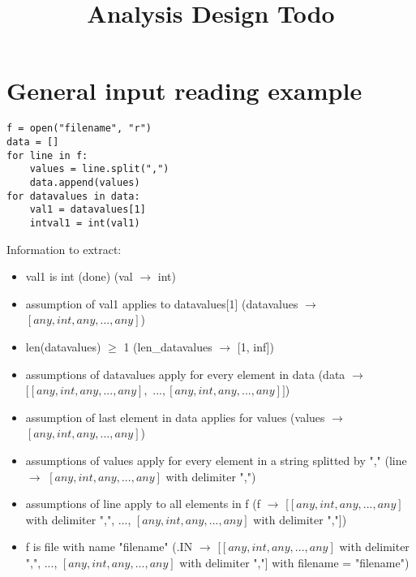 \documentclass[11pt]{article}
\begin{document}
\title{Analysis Design Todo}

\maketitle


\section{General input reading example}

\begin{lstlisting}
f = open("filename", "r")
data = []
for line in f:
    values = line.split(",")
    data.append(values)
for datavalues in data:
    val1 = datavalues[1]
    intval1 = int(val1)
\end{lstlisting}

Information to extract:\\

\begin{itemize}
  \item val1 is int (done) (val $\rightarrow$ int)
  \item assumption of val1 applies to datavalues[1] (datavalues $\rightarrow$ $[any, int, any, ..., any]$)
  \item len(datavalues) $\ge$ 1 (len\_datavalues $\rightarrow$ [1, inf])
  \item assumptions of datavalues apply for every element in data (data $\rightarrow$ $[[any, int, any, ..., any], $ $..., [any, int, any, ..., any]]$)
  \item assumption of last element in data applies for values (values $\rightarrow$ $[any, int, any, ..., any]$)
  \item assumptions of values apply for every element in a string splitted by "," (line $\rightarrow$ $[any, int, any, ..., any]$ with delimiter ",")
  \item assumptions of line apply to all elements in f (f $\rightarrow$ [$[any, int, any, ..., any]$ with delimiter ",", ..., $[any, int, any, ..., any]$ with delimiter ","])
  \item f is file with name "filename" (.IN $\rightarrow$ [$[any, int, any, ..., any]$ with delimiter ",", ..., $[any, int, any, ..., any]$ with delimiter ","] with filename = "filename")
\end{itemize}
\end{document}
